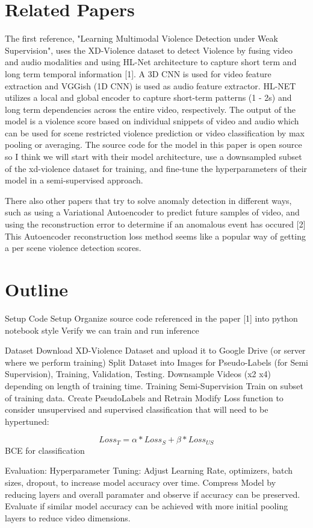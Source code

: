 \documentclass[twocolumn]{article}
\begin{document}
	\section{Related Papers}
	The first reference, "Learning Multimodal Violence Detection under Weak Supervision", uses the XD-Violence dataset to detect Violence
	by fusing video and audio modalities and using HL-Net architecture to capture short term and long term temporal information [1]. A 3D CNN 
	is used for video feature extraction and VGGish (1D CNN) is used as audio feature extractor. HL-NET utilizes a local and global encoder 
	to capture short-term patterns (1 - 2s) and long term dependencies across the entire video, respectively. The output of the model is a 
	violence score based on individual snippets of video and audio which can be used for scene restricted violence prediction or video classification
	by max pooling or averaging. The source code for the model in this paper is open source 
	so I think we will start with their model architecture, use a downsampled subset of the xd-violence 
	dataset for training, and fine-tune the hyperparameters of their model in a semi-supervised approach.

	There also other papers that try to solve anomaly detection in different ways, such as using a 
	Variational Autoencoder to predict future samples of video, and using the reconstruction error to 
	determine if an anomalous event has occured [2] This Autoencoder reconstruction loss
	method seems like a popular way of getting a per scene violence detection 
	scores. 
	
	\section{Outline}

	\begin{outline}
		\1 Setup
		   \2 Code Setup
				\3 Organize source code referenced in the paper [1] into python notebook style
				\3 Verify we can train and run inference
			
		  \2 Dataset
				\3 Download XD-Violence Dataset and upload it to Google Drive (or server where we 
				perform training)
				\3 Split Dataset into Images for Pseudo-Labels (for Semi Supervision), Training, Validation, Testing. 
				\3 Downsample Videos (x2 x4) depending on length of training time.
		\1 Training
			\2 Semi-Supervision
				\3 Train on subset of training data. 
				\3 Create PseudoLabels and Retrain
				\3 Modify Loss function to consider unsupervised and supervised 
				classification that will need to be hypertuned:

				\[Loss_T  = \alpha * Loss_S + \beta * Loss_{US}\]
				\3 BCE for classification

		\1 Evaluation: 
		\2 Hyperparameter Tuning:
		 Adjust Learning Rate, optimizers, batch sizes, dropout, to increase
		model accuracy over time. 
		\2 Compress Model by reducing layers and overall paramater and observe 
		if accuracy can be preserved.
		\3 Evaluate if similar model accuracy can be achieved with more initial 
		pooling layers to reduce video dimensions.
				
	 \end{outline}
	
\end{document}
